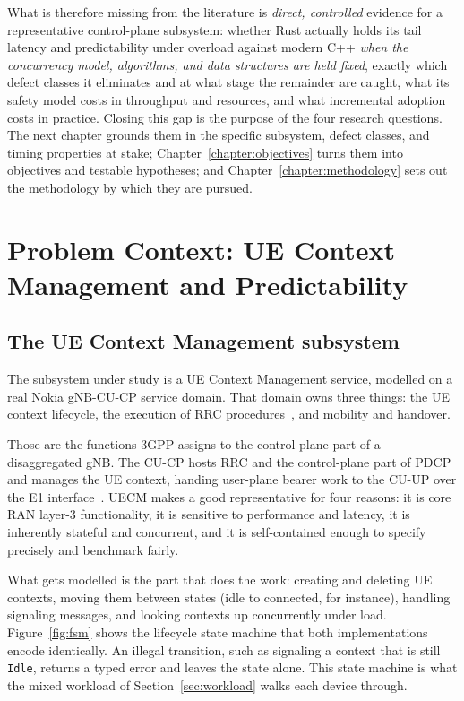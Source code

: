 \documentclass[english,twoside,openright,a4paper,censored,csm,software-track-2020]{HYthesisML}
\begin{document}
What is therefore missing from the literature
is \emph{direct, controlled} evidence for a representative control-plane subsystem: whether
Rust actually holds its tail latency and predictability under overload against modern C++
\emph{when the concurrency model, algorithms, and data structures are held fixed},
exactly which defect classes it eliminates and at what stage the remainder are caught, what
its safety model costs in throughput and resources, and what incremental adoption costs in
practice. Closing this gap is the purpose of the four research questions. The next chapter
grounds them in the specific subsystem, defect classes, and timing properties at stake;
Chapter~\ref{chapter:objectives} turns them into objectives and testable hypotheses; and
Chapter~\ref{chapter:methodology} sets out the methodology by which they are pursued.

\chapter{Problem Context: UE Context Management and Predictability\label{chapter:context}}

\section{The UE Context Management subsystem}
The subsystem under study is a UE Context Management service, modelled on a real Nokia gNB-CU-CP
service domain. That domain owns three things: the UE context lifecycle, the execution of RRC
procedures~\cite{3gpp38331}, and mobility and handover.

Those are the functions 3GPP assigns to the control-plane part of a disaggregated gNB. The CU-CP
hosts RRC and the control-plane part of PDCP and manages the UE context, handing user-plane
bearer work to the CU-UP over the E1 interface~\cite{3gpp38401,3gpp38300,3gpp38463}. UECM makes a
good representative for four reasons: it is core RAN layer-3 functionality, it is sensitive to
performance and latency, it is inherently stateful and concurrent, and it is self-contained
enough to specify precisely and benchmark fairly.

What gets modelled is the part that does the work: creating and deleting UE contexts, moving them
between states (idle to connected, for instance), handling signaling messages, and looking
contexts up concurrently under load. Figure~\ref{fig:fsm} shows the lifecycle state machine that
both implementations encode identically. An illegal transition, such as signaling a context that
is still \texttt{Idle}, returns a typed error and leaves the state alone. This state machine is
what the mixed workload of Section~\ref{sec:workload} walks each device through.
\end{document}
